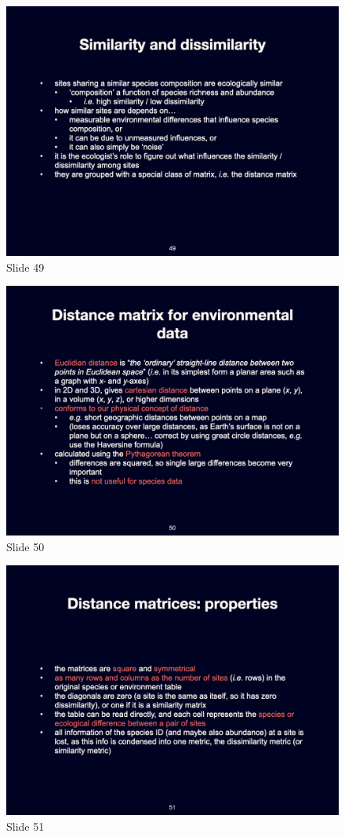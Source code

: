 \documentclass[
  12pt,
]{book}
\begin{document}
\begin{figure}[ht]
\centering
\includegraphics[width=0.8\linewidth]{../images/BDC334/BDC334-049.jpeg}
\caption*{Slide 49}
\end{figure}

\begin{figure}[ht]
\centering
\includegraphics[width=0.8\linewidth]{../images/BDC334/BDC334-050.jpeg}
\caption*{Slide 50}
\end{figure}

\begin{figure}[ht]
\centering
\includegraphics[width=0.8\linewidth]{../images/BDC334/BDC334-051.jpeg}
\caption*{Slide 51}
\end{figure}
\end{document}
